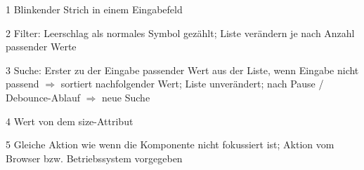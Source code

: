 \begin{table}[!htb]
\begin{adjustbox}{max width=\textwidth}
\begin{threeparttable}
\begin{tablenotes}
                \scriptsize
                \item[1] Blinkender Strich in einem Eingabefeld
                \item[2] Filter: Leerschlag als normales Symbol gezählt; Liste verändern je nach Anzahl passender Werte
                \item[3] Suche: Erster zu der Eingabe passender Wert aus der Liste, wenn Eingabe nicht passend $\Rightarrow$ sortiert nachfolgender Wert; 
                                Liste unverändert; nach Pause / Debounce-Ablauf $\Rightarrow$ neue Suche
                \item[4] Wert von dem size-Attribut
                \item[5] Gleiche Aktion wie wenn die Komponente nicht fokussiert ist; Aktion vom Browser bzw. Betriebssystem vorgegeben
            \end{tablenotes}
        \end{threeparttable}
    \end{adjustbox}
\end{table}
